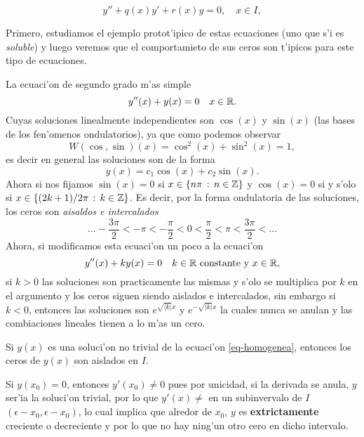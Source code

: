 \documentclass[main.tex]{subfiles}
\begin{document}
\begin{equation}
y'' + q(x) y' + r(x) y = 0, \quad x \in I,
\end{equation}

Primero, estudiamos el ejemplo protot'ipico de estas ecuaciones (uno que s'i es \emph{soluble}) y luego veremos que el comportamieto de sus ceros son t'ipicos para este tipo de ecuaciones.

\eje La ecuaci'on de segundo grado m'as simple
\[
  y''(x)+y(x)=0\quad x\in\mathbb R .
\]
Cuyas soluciones linealmente independientes son \(\cos(x)\) y \(\sin(x)\) (las bases de los fen'omenos ondulatorios), ya que como podemos observar
\[
  W(\cos,\sin)(x)=\cos^{2}(x)+\sin^{2}(x)=1,
\]
es decir en general las soluciones son de la forma
\[
  y(x)=c_{1}\cos(x)+c_{2}\sin(x).
\]
Ahora si nos fijamos \(\sin(x)=0\) si \(x\in\{n\pi\,:\,n\in \mathbb Z \}\) y \(\cos(x)=0\) si y s'olo si \hbox{\(x\in\{(2k+1)/2\pi\,:\,k\in \mathbb Z \}\)}. Es decir, por la forma ondulatoria de las soluciones, los ceros son \emph{aisaldos e intercalados}
\[
  \dots-\frac{3\pi}{2}<-\pi<-\frac{\pi}{2}<0<\frac{\pi}{2}<\pi<\frac{3\pi}{2}<\dots
\]
Ahora, si modificamos esta ecuaci'on un poco a la ecuaci'on
\[
  y''(x)+ky(x)=0\quad k\in\mathbb R \text{ constante y }x\in\mathbb R ,
\]
si \(k>0\) las soluciones son practicamente las mismas y s'olo se multiplica por \(k\) en el argumento y los ceros siguen siendo aislados e intercalados, sin embargo si \(k<0\), entonces las soluciones son \(e^{\sqrt{|k|}x}\) y \(e^{-\sqrt{|k|}x}\) la cuales nunca se anulan y las combiaciones lineales tienen a lo m'as un cero.

\begin{lema}
  Si \(y(x)\) es una soluci'on no trivial de la ecuaci'on \ref{eq-homogenea}, entonces los ceros de \(y(x)\) son aislados en \(I\).
\end{lema}
\dem Si \(y(x_{0})=0\), entonces \(y'(x_{0})\neq0\) pues por unicidad, si la derivada se anula, \(y\) ser'ia la soluci'on trivial, por lo que \(y'(x)\neq\) en un subinvervalo de \(I\) \((\epsilon-x_{0},\epsilon-x_{0})\), lo cual implica que alredor de \(x_{0}\), \(y\) es \textbf{extrictamente} creciente o decreciente y por lo que no hay ning'un otro cero en dicho intervalo.
\QED\\
\end{document}
